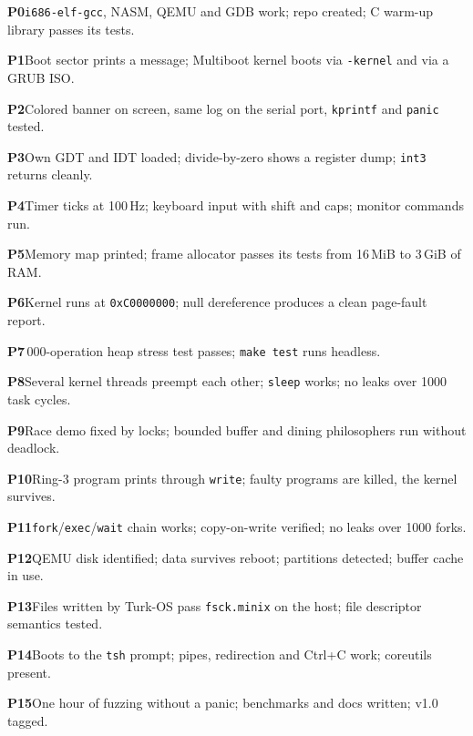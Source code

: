 \documentclass[11pt,a4paper]{article}
\begin{document}
\begin{checklist}
  \item \textbf{P0}\enspace \texttt{i686-elf-gcc}, NASM, QEMU and GDB work; repo created; C warm-up library passes its tests.
  \item \textbf{P1}\enspace Boot sector prints a message; Multiboot kernel boots via \texttt{-kernel} and via a GRUB ISO.
  \item \textbf{P2}\enspace Colored banner on screen, same log on the serial port, \texttt{kprintf} and \texttt{panic} tested.
  \item \textbf{P3}\enspace Own GDT and IDT loaded; divide-by-zero shows a register dump; \texttt{int3} returns cleanly.
  \item \textbf{P4}\enspace Timer ticks at 100\,Hz; keyboard input with shift and caps; monitor commands run.
  \item \textbf{P5}\enspace Memory map printed; frame allocator passes its tests from 16\,MiB to 3\,GiB of RAM.
  \item \textbf{P6}\enspace Kernel runs at \texttt{0xC0000000}; null dereference produces a clean page-fault report.
  \item \textbf{P7}\,000-operation heap stress test passes; \texttt{make test} runs headless.
  \item \textbf{P8}\enspace Several kernel threads preempt each other; \texttt{sleep} works; no leaks over 1000 task cycles.
  \item \textbf{P9}\enspace Race demo fixed by locks; bounded buffer and dining philosophers run without deadlock.
  \item \textbf{P10}\enspace Ring-3 program prints through \texttt{write}; faulty programs are killed, the kernel survives.
  \item \textbf{P11}\enspace \texttt{fork}/\texttt{exec}/\texttt{wait} chain works; copy-on-write verified; no leaks over 1000 forks.
  \item \textbf{P12}\enspace QEMU disk identified; data survives reboot; partitions detected; buffer cache in use.
  \item \textbf{P13}\enspace Files written by Turk-OS pass \texttt{fsck.minix} on the host; file descriptor semantics tested.
  \item \textbf{P14}\enspace Boots to the \texttt{tsh} prompt; pipes, redirection and Ctrl+C work; coreutils present.
  \item \textbf{P15}\enspace One hour of fuzzing without a panic; benchmarks and docs written; v1.0 tagged.

\end{checklist}
\end{document}
